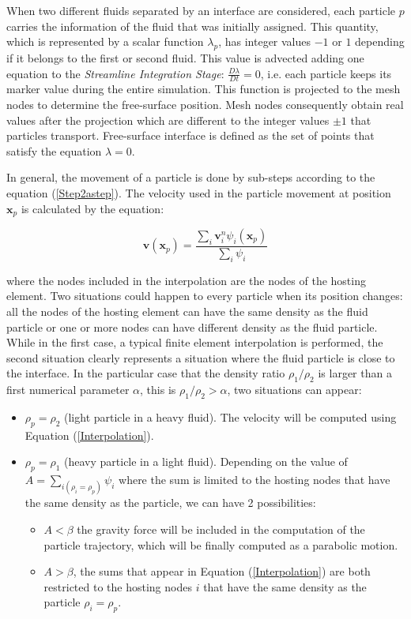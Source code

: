 When two different fluids separated by an interface are considered, each particle $p$ carries the information of the fluid that was initially assigned. This quantity, which is represented by a scalar function $\lambda_p$, has integer values $-1$ or $1$ depending if it belongs to the first or second fluid. This value is advected adding one equation to the \textit{Streamline Integration Stage}: $\frac{D\lambda}{Dt}=0$, i.e. each particle keeps its marker value during the entire simulation. This function is projected to the mesh nodes to determine the free-surface position. Mesh nodes consequently obtain real values after the projection which are different to the integer values $\pm1$ that particles transport. Free-surface interface is defined as the set of points that satisfy the equation $\lambda=0$.

In general, the movement of a particle is done by sub-steps according to the equation (\ref{Step2astep}). The velocity used in the particle movement at position $\mathbf{x}_p$ is calculated by the equation:

\begin{equation}\label{Interpolation}
    \displaystyle \mathbf{v}(\mathbf{x}_p)=\frac{\displaystyle \sum_{i}\mathbf{v}_i^n\psi_i(\mathbf{x}_p)}{\displaystyle \sum_{i}\psi_i}
\end{equation}

where the nodes included in the interpolation are the nodes of the hosting element. Two situations could happen to every particle when its position changes: all the nodes of the hosting element can have the same density as the fluid particle or one or more nodes can have different density as the fluid particle. While in the first case, a typical finite element interpolation is performed, the second situation clearly represents a situation where the fluid particle is close to the interface. In the particular case that the density ratio $\rho_1/\rho_2$ is larger than a first numerical parameter $\alpha$, this is $\rho_1/\rho_2>\alpha$, two situations can appear:

 \begin{itemize}
 \item $\rho_p=\rho_2$ (light particle in a heavy fluid). The velocity will be computed using Equation (\ref{Interpolation}).
   \item $\rho_p=\rho_1$ (heavy particle in a light fluid). Depending on the value of $A=\sum_{i(\rho_i=\rho_p)}\psi_i$ where the sum is limited to the hosting nodes that have the same density as the particle, we can have 2 possibilities:
       \begin{itemize}
 \item $A<\beta$ the gravity force will be included in the computation of the particle trajectory, which will be finally computed as a parabolic motion.
   \item $A>\beta$, the sums that appear in Equation (\ref{Interpolation}) are both restricted to the hosting nodes $i$ that have the same density as the particle $\rho_i=\rho_p$.
 \end{itemize}
 \end{itemize}

